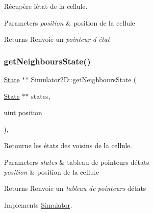 Récupère l\textquotesingle{}état de la cellule. 


\begin{DoxyParams}{Parameters}
{\em position} & position de la cellule \\
\hline
\end{DoxyParams}
\begin{DoxyReturn}{Returns}
Renvoie un {\itshape pointeur} {\itshape d\textquotesingle{}} {\itshape état} 
\end{DoxyReturn}
\mbox{\label{class_simulator2_d_ab55bb44d381dd2554457613426eecd86}} 
\subsubsection{\texorpdfstring{get\+Neighbours\+State()}{getNeighboursState()}}
{\footnotesize\ttfamily \mbox{\hyperlink{class_state}{State}} $\ast$$\ast$ Simulator2\+D\+::get\+Neighbours\+State (\begin{DoxyParamCaption}\item[{\mbox{\hyperlink{class_state}{State}} $\ast$$\ast$}]{states,  }\item[{uint}]{position }\end{DoxyParamCaption})\hspace{0.3cm}{\ttfamily [protected]}, {\ttfamily [virtual]}}



Retourne les états des voisins de la cellule. 


\begin{DoxyParams}{Parameters}
{\em states} & tableau de pointeurs d\textquotesingle{}états \\
\hline
{\em position} & position de la cellule \\
\hline
\end{DoxyParams}
\begin{DoxyReturn}{Returns}
Renvoie un {\itshape tableau} {\itshape de} {\itshape pointeurs} d\textquotesingle{}états 
\end{DoxyReturn}


Implements \mbox{\hyperlink{class_simulator}{Simulator}}.

\mbox{\label{class_simulator2_d_a13bef7a120cba5b62fed4a89f0bc627a}} 
